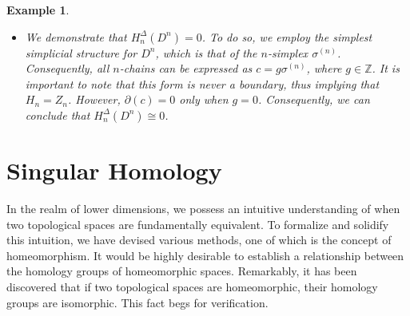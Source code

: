 \documentclass{amsart}
\newtheorem{example}[definition]{Example}
\begin{document}
\begin{example}
\begin{itemize}
	\begin{equation}
	\label{chain}
	c = \sum_{i=0}^{n+1}g_i (v_0,\ldots,v_{i-1},v_{i+1},\ldots,v_n),
	\end{equation}
	where $g_i \in \mathbb{Z}$. Since $\sigma^{(n+1)}$ itself is not part of the structure, there are no boundaries in $Z_n$, the group of cycles. Therefore, $H_n = Z_n/B_n$ represents the group of cycles. If $c \in Z_n$, then $\partial(c) = 0$. By using Eq. \ref{chain}, we have:
	\begin{align} \partial(c) = &\partial\left(\sum_{i=0}^{n+1} g_i(v_0,\ldots,v_{i-1},v_{i+1},\ldots,v_n) \right) \\ = &\sum_{i=0}^{n+1}g_i \big(\sum_{j1}^{n+1}(-1)^j(v_0,\ldots,v_{i-1},v_{i+1},\ldots,v_{j-1},v_{j+1},\ldots,v_n)\big). \end{align}
	By rearranging this sum, we obtain terms of the form:
	\begin{equation} \label{terms} (g_k-g_l)(v_0,\ldots,v_{j-1},v_{j+1},\ldots,v_{i-1},v_{i+1},\ldots,v_n) \end{equation}
	where $k,l = 0, \ldots, n+1$ for all $i,j = 0, \ldots, n$. Each pair of $n$-simplices of $\sigma^{(n+1)}$ intersect along an $(n-1)$-face. Therefore, we obtain terms of the form given in Eq. \ref{terms} for each of these faces. From this, we can deduce that if $\partial(c) = 0$, we must have $g_k = g_l$ for all $k,l = 0, \ldots, n+1$. In other words, $g_0 = g_1 = \cdots = g_{n+1}$. Consequently, our original $n$-chain can be rewritten as:
	\begin{equation} c = \sum_{i=0}^{n+1}g_0(v_0,\ldots,v_{i-1},v_{i+1},\ldots,v_n), \end{equation}
	allowing us to choose $g_0$ from $\mathbb{Z}$. Thus, we conclude that $H^\Delta_n(S^n) \cong \mathbb{Z}$.
	\item We demonstrate that $H^\Delta_n(D^n) = 0$. To do so, we employ the simplest simplicial structure for $D^n$, which is that of the $n$-simplex $\sigma^{(n)}$. Consequently, all $n$-chains can be expressed as $c = g \sigma^{(n)}$, where $g \in \mathbb{Z}$. It is important to note that this form is never a boundary, thus implying that $H_n = Z_n$. However, $\partial(c) = 0$ only when $g = 0$. Consequently, we can conclude that $H^\Delta_n(D^n) \cong 0$.
\end{itemize}
\end{example}

\section{Singular Homology}
In the realm of lower dimensions, we possess an intuitive understanding of when two topological spaces are fundamentally \glqq equivalent\grqq{}. To formalize and solidify this intuition, we have devised various methods, one of which is the concept of homeomorphism. It would be highly desirable to establish a relationship between the homology groups of homeomorphic spaces. Remarkably, it has been discovered that if two topological spaces are homeomorphic, their homology groups are isomorphic. This fact begs for verification.
\end{document}
